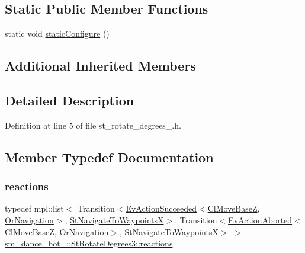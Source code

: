 \subsection*{Static Public Member Functions}
\begin{DoxyCompactItemize}
\item 
static void \hyperlink{structsm__dance__bot__2_1_1StRotateDegrees3_a9d399bede58a43d648f230e5c61f0f32}{static\+Configure} ()
\end{DoxyCompactItemize}
\subsection*{Additional Inherited Members}


\subsection{Detailed Description}


Definition at line 5 of file st\+\_\+rotate\+\_\+degrees\+\_.\+h.



\subsection{Member Typedef Documentation}
\mbox{\label{structsm__dance__bot__2_1_1StRotateDegrees3_afba3c9cb04c164c985626e9abcfd5ea8}} 
\subsubsection{\texorpdfstring{reactions}{reactions}}
{\footnotesize\ttfamily typedef mpl\+::list$<$ Transition$<$\hyperlink{structsmacc_1_1default__events_1_1EvActionSucceeded}{Ev\+Action\+Succeeded}$<$\hyperlink{classcl__move__base__z_1_1ClMoveBaseZ}{Cl\+Move\+BaseZ}, \hyperlink{classsm__dance__bot__2_1_1OrNavigation}{Or\+Navigation}$>$, \hyperlink{structsm__dance__bot__2_1_1StNavigateToWaypointsX}{St\+Navigate\+To\+WaypointsX}$>$, Transition$<$\hyperlink{structsmacc_1_1default__events_1_1EvActionAborted}{Ev\+Action\+Aborted}$<$\hyperlink{classcl__move__base__z_1_1ClMoveBaseZ}{Cl\+Move\+BaseZ}, \hyperlink{classsm__dance__bot__2_1_1OrNavigation}{Or\+Navigation}$>$, \hyperlink{structsm__dance__bot__2_1_1StNavigateToWaypointsX}{St\+Navigate\+To\+WaypointsX}$>$ $>$ \hyperlink{structsm__dance__bot__2_1_1StRotateDegrees3_afba3c9cb04c164c985626e9abcfd5ea8}{sm\+\_\+dance\+\_\+bot\+\_\+::\+St\+Rotate\+Degrees3\+::reactions}}



